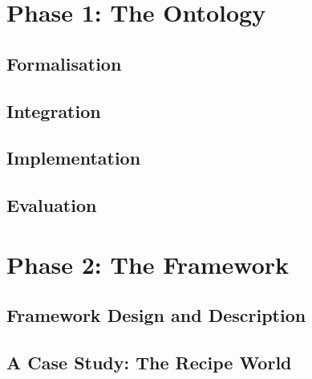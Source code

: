 \part{Phase 1: The Ontology}






\chapter{Formalisation}\label{ch: Formalisation}
\chapter{Integration}\label{ch: Integration}
\chapter{Implementation}\label{ch: Implementation}
\chapter{Evaluation}\label{ch: Evaluation}

\part{Phase 2: The Framework}

\chapter{Framework Design and Description}\label{ch: Framework Design}

\chapter{A Case Study: The Recipe World}\label{ch: Case Study: Recipe World}

